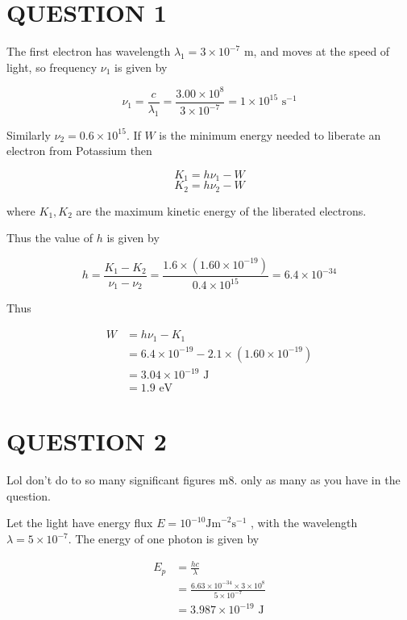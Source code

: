 \documentclass[a4paper]{article}
\begin{document}
	
\maketitle

\section{QUESTION 1}

The first electron has wavelength $ \lambda_{1} = 3 \times 10^{-7} $ m, and moves at the speed of light, so frequency $ \nu_{1} $ is given by

\[ \nu_{1} = \frac{c}{\lambda_{1}} = \frac{3.00 \times 10^{8}}{3 \times 10^{-7}} = 1 \times 10^{15} \text{ s}^{-1}  \]

Similarly $ \nu_{2} =  0.6 \times 10^{15} $. If $ W $ is the minimum energy needed to liberate an electron from Potassium then

\[ K_{1} = h \nu_{1} - W \]
\[  K_{2} = h \nu_{2} - W \]

where $ K_{1},K_{2} $ are the maximum kinetic energy of the liberated electrons. 

Thus the value of $ h $ is given by

\[ h = \frac{K_{1} - K_{2}}{\nu_{1} - \nu_{2}} = \frac{1.6 \times (1.60 \times 10^{-19})}{0.4 \times 10^{15}} = 6.4 \times 10^{-34}\]

Thus 


\begin{align*}
W & = h\nu_{1} - K_{1} \\
& = 6.4 \times 10^{-19} - 2.1 \times (1.60 \times 10^{-19}) \\
& = 3.04 \times 10^{-19} \text{ J} \\
& = 1.9 \text{ eV}
\end{align*}

\section{QUESTION 2}

Lol don't do to so many significant figures m8. only as many as you have in the question. 

Let the light have energy flux $ E = 10^{-10} \text{Jm}^{-2}\text{s}^{-1} $ , with the wavelength $ \lambda = 5 \times 10^{-7} $. The energy of one photon is given by

\begin{align*}
E_{p} & = \frac{h c}{\lambda} \\
& = \frac{6.63 \times 10^{-34} \times 3 \times 10^{8} }{5 \times 10^{-7}}\\
& = 3.987 \times 10^{-19} \text{ J}
\end{align*}
\end{document}
